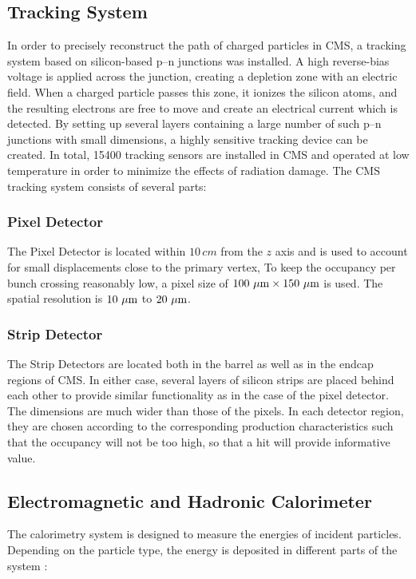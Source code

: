 \subsection{Tracking System}
In order to precisely reconstruct the path of charged particles in CMS, a tracking system based on silicon-based p--n junctions was installed. A high reverse-bias voltage is applied across the junction, creating a depletion zone with an electric field. When a charged particle passes this zone, it ionizes the silicon atoms, and the resulting electrons are free to move and create an electrical current which is detected. By setting up several layers containing a large number of such p--n junctions with small dimensions, a highly sensitive tracking device can be created. In total, 15400 tracking sensors are installed in CMS and operated at low temperature in order to minimize the effects of radiation damage. The CMS tracking system consists of several parts:

\subsubsection*{Pixel Detector}
The Pixel Detector is located within $10\,\unit{cm}$ from the $z$ axis and is used to account for small displacements close to the primary vertex, To keep the occupancy per bunch crossing reasonably low, a pixel size of $100\,\,\mu\text{m} \times 150\,\,\mu\text{m}$ is used. The spatial resolution is $10\,\,\mu\text{m}$ to $20\,\,\mu\text{m}$.

\subsubsection*{Strip Detector}
The Strip Detectors are located both in the barrel as well as in the endcap regions of CMS. In either case, several layers of silicon strips are placed behind each other to provide similar functionality as in the case of the pixel detector. The dimensions are much wider than those of the pixels. In each detector region, they are chosen according to the corresponding production characteristics such that the occupancy will not be too high, so that a hit will provide informative value.

\subsection{Electromagnetic and Hadronic Calorimeter}
The calorimetry system is designed to measure the energies of incident particles. Depending on the particle type, the energy is deposited in different parts of the system \cite{EvaHalkiadakis}:

